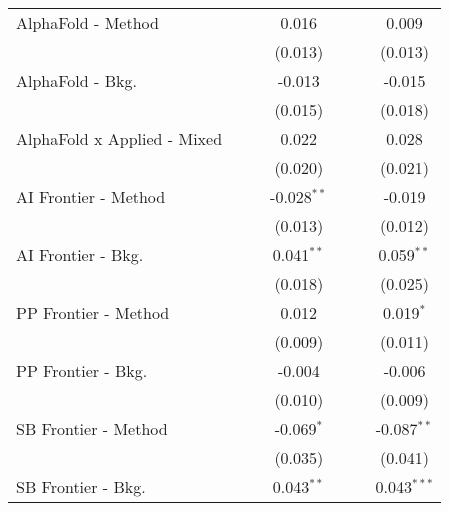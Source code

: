 \begin{tabular}{lcccccc}
   AlphaFold - Method             &         &              & 0.016          &         &               & 0.009\\   
                                  &         &              & (0.013)        &         &               & (0.013)\\   
   AlphaFold - Bkg.               &         &              & -0.013         &         &               & -0.015\\   
                                  &         &              & (0.015)        &         &               & (0.018)\\   
   AlphaFold x Applied - Mixed    &         &              & 0.022          &         &               & 0.028\\   
                                  &         &              & (0.020)        &         &               & (0.021)\\   
   AI Frontier - Method           &         &              & -0.028$^{**}$  &         &               & -0.019\\   
                                  &         &              & (0.013)        &         &               & (0.012)\\   
   AI Frontier - Bkg.             &         &              & 0.041$^{**}$   &         &               & 0.059$^{**}$\\   
                                  &         &              & (0.018)        &         &               & (0.025)\\   
   PP Frontier - Method           &         &              & 0.012          &         &               & 0.019$^{*}$\\   
                                  &         &              & (0.009)        &         &               & (0.011)\\   
   PP Frontier - Bkg.             &         &              & -0.004         &         &               & -0.006\\   
                                  &         &              & (0.010)        &         &               & (0.009)\\   
   SB Frontier - Method           &         &              & -0.069$^{*}$   &         &               & -0.087$^{**}$\\   
                                  &         &              & (0.035)        &         &               & (0.041)\\   
   SB Frontier - Bkg.             &         &              & 0.043$^{**}$   &         &               & 0.043$^{***}$\\   

\end{tabular}
